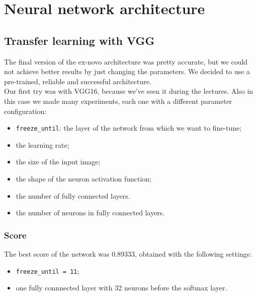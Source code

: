 \documentclass[12pt,a4paper]{report}
\begin{document}

	\chapter{Neural network architecture}
		
		\section{Transfer learning with VGG}
	The final version of the ex-novo architecture was pretty accurate, but we could not achieve better results by just changing the parameters. We decided to use a pre-trained, reliable and successful architecture.\\
	Our first try was with VGG16, because we've seen it during the lectures. Also in this case we made many experiments, each one with a different parameter configuration:
	\begin{itemize}
		\item \texttt{freeze\_until}: the layer of the network from which we want to fine-tune;
		\item the learning rate;
		\item the size of the input image;
		\item the shape of the neuron activation function;	
		\item the number of fully connected layers.
		\item the number of neurons in fully connected layers.
	\end{itemize}
		\subsection{Score}
The best score of the network was 0.89333, obtained with the following settings: 
	\begin{itemize}
		\item	\texttt{freeze\_until = 11};
		\item one fully connnected layer with 32 neurons before the softmax layer.
	\end{itemize}
\end{document}
